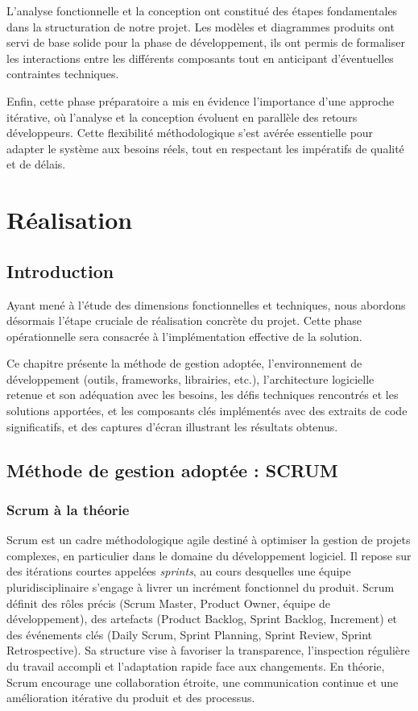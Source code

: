 \documentclass[12pt,a4paper]{report}
\begin{document}
	L’analyse fonctionnelle et la conception ont constitué des étapes fondamentales dans la structuration de notre projet. Les modèles et diagrammes produits ont servi de base solide pour la phase de développement, ils ont permis de formaliser les interactions entre les différents composants tout en anticipant d’éventuelles contraintes techniques.
	
	Enfin, cette phase préparatoire a mis en évidence l’importance d’une approche itérative, où l’analyse et la conception évoluent en parallèle des retours développeurs. Cette flexibilité méthodologique s’est avérée essentielle pour adapter le système aux besoins réels, tout en respectant les impératifs de qualité et de délais.
	
	\chapter{Réalisation}
	
	\section{Introduction}
	
	Ayant mené à l'étude des dimensions fonctionnelles et techniques, nous abordons désormais l'étape cruciale de réalisation concrète du projet. Cette phase opérationnelle sera consacrée à l'implémentation effective de la solution.
	
	Ce chapitre présente la méthode de gestion adoptée, l'environnement de développement (outils, frameworks, librairies, etc.), l'architecture logicielle retenue et son adéquation avec les besoins, les défis techniques rencontrés et les solutions apportées, et les composants clés implémentés avec des extraits de code significatifs, et des captures d'écran illustrant les résultats obtenus.
	
	\section{Méthode de gestion adoptée : SCRUM}
	
	\subsection{Scrum à la théorie}
	
	Scrum est un cadre méthodologique agile destiné à optimiser la gestion de projets complexes, en particulier dans le domaine du développement logiciel. Il repose sur des itérations courtes appelées \textit{sprints}, au cours desquelles une équipe pluridisciplinaire s'engage à livrer un incrément fonctionnel du produit. Scrum définit des rôles précis (Scrum Master, Product Owner, équipe de développement), des artefacts (Product Backlog, Sprint Backlog, Increment) et des événements clés (Daily Scrum, Sprint Planning, Sprint Review, Sprint Retrospective). Sa structure vise à favoriser la transparence, l’inspection régulière du travail accompli et l’adaptation rapide face aux changements. En théorie, Scrum encourage une collaboration étroite, une communication continue et une amélioration itérative du produit et des processus.
	
\end{document}
